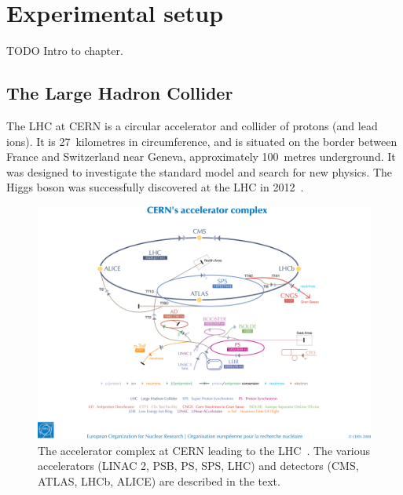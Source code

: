 \chapter{Experimental setup}
\label{chap:detector}
TODO Intro to chapter.

\section{The Large Hadron Collider}
The LHC at CERN is a circular accelerator and collider of protons (and lead 
ions). It is 27~kilometres in circumference, and is situated on the border 
between France and Switzerland near Geneva, approximately 100~metres 
underground. It was designed to investigate the standard model and search for 
new physics. The Higgs boson was successfully discovered at the LHC in 
2012~\cite{higgs-cms,higgs-atlas}.

\begin{figure}
\centering
\includegraphics[width=1\textwidth, trim={2cm 5cm 2cm 1.5cm}, 
clip]{figs/detector/lhc-complex}
\caption{The accelerator complex at CERN leading to the LHC~\cite{lhc-complex}. 
The various accelerators (LINAC 2, PSB, PS, SPS, LHC) and detectors (CMS, 
ATLAS, LHCb, ALICE) are described in the text.}
\label{fig:lhc-complex}
\end{figure}


